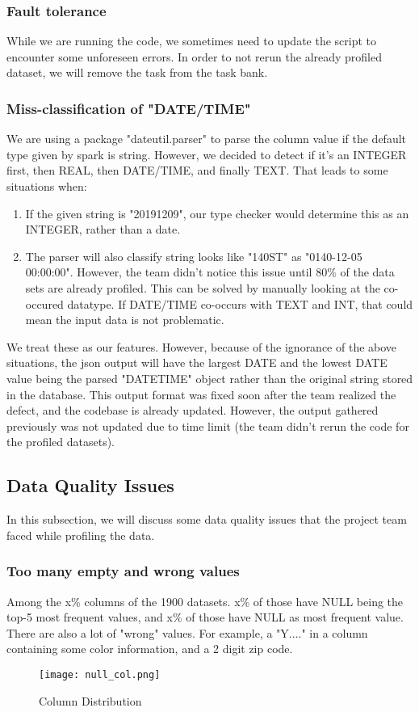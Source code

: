 \documentclass[sigconf]{acmart}
\begin{document}
\subsubsection{Fault tolerance}
While we are running the code, we sometimes need to update the script to encounter some unforeseen errors. In order to not rerun the already profiled dataset, we will remove the task from the task bank.
\subsubsection{Miss-classification of "DATE/TIME"}
We are using a package "dateutil.parser" to parse the column value if the default type given by spark is string. However, we decided to detect if it's an INTEGER first, then REAL, then DATE/TIME, and finally TEXT. That leads to some situations when:
\begin{enumerate}
    \item If the given string is "20191209", our type checker would determine this as an INTEGER, rather than a date.
    \item The parser will also classify string looks like "140ST" as "0140-12-05 00:00:00". However, the team didn't notice this issue until 80\% of the data sets are already profiled. This can be solved by manually looking at the co-occured datatype. If DATE/TIME co-occurs with TEXT and INT, that could mean the input data is not problematic.
\end{enumerate}
We treat these as our features. However, because of the ignorance of the above situations, the json output will have the largest DATE and the lowest DATE value being the parsed "DATETIME" object rather than the original string stored in the database. This output format was fixed soon after the team realized the defect, and the codebase is already updated. However, the output gathered previously was not updated due to time limit (the team didn't rerun the code for the profiled datasets).
\subsection{Data Quality Issues}
In this subsection, we will discuss some data quality issues that the project team faced while profiling the data.
\subsubsection{Too many empty and wrong values} Among the x\% columns of the 1900 datasets. x\% of those have NULL being the top-5 most frequent values, and x\% of those have NULL as most frequent value. There are also a lot of "wrong" values. For example, a "Y...." in a column containing some color information, and a 2 digit zip code.
\begin{figure}[htp]
    \centering
    \texttt{[image: null\_col.png]}
    \caption{Column Distribution}
    \label{fig:galaxy}
\end{figure}
\end{document}
